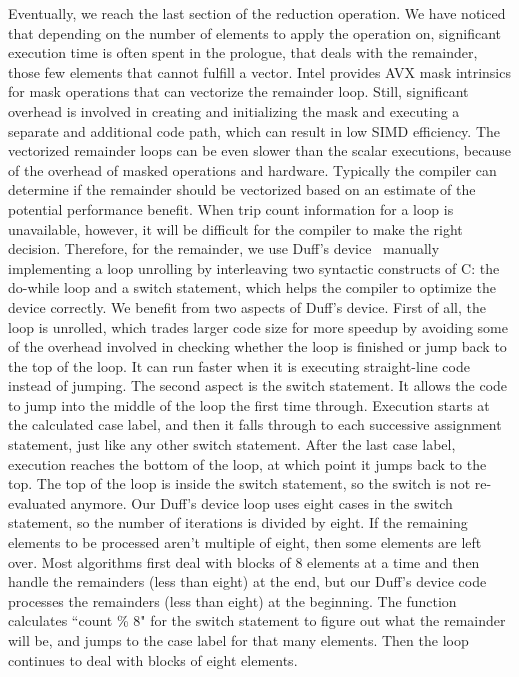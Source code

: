 \documentclass[5p,times,twocolumn]{elsarticle}
\begin{document}
Eventually, we reach the last section of the reduction operation. We have
noticed that depending on the number of elements to apply the
operation on, significant execution time is often spent in the
prologue, that deals with the remainder, those few elements that cannot fulfill a vector.
Intel provides AVX mask intrinsics for mask operations that can vectorize the remainder loop.
Still, significant overhead is involved in creating and initializing the mask and
executing a separate and additional code path, which can result in low SIMD efficiency.
%
The vectorized remainder loops can be even slower than the scalar executions,
because of the overhead of masked operations and hardware.
%
Typically the compiler can determine if the remainder should be vectorized
based on an estimate of the potential performance benefit. When trip count information for a
loop is unavailable, however, it will be difficult for the
compiler to make the right decision.
%
Therefore, for the remainder, we use Duff's
device~\cite{wiki:duff} manually implementing a loop unrolling by
interleaving two syntactic constructs of C: the do-while loop and a
switch statement, which helps the compiler to optimize the device
correctly.
%
We benefit from two aspects of Duff's device. First of all, the loop is unrolled,
which trades larger code size for more speedup by avoiding some of the overhead
involved in checking whether the loop is finished or jump back to the
top of the loop.
It can run faster when it is executing straight-line code instead of jumping.
The second aspect is the switch statement. It allows the code to jump into the middle of the
loop the first time through.
Execution starts at the calculated case label, and then it falls through to each successive
assignment statement, just like any other switch statement.
%
After the last case label, execution reaches the bottom of the loop, at which point it jumps back to the top. The top of the loop is inside the switch statement, so the switch is not re-evaluated anymore.
%
Our Duff's device loop uses eight cases in the switch statement, so the number of iterations is divided by eight.
If the remaining elements to be processed aren't multiple of eight, then some elements are left over.
Most algorithms first deal with blocks of 8 elements at a time and then handle the remainders (less than eight) at the end,
but our Duff's device code processes the remainders (less than eight) at the beginning.
The function calculates ``count \% 8" for the switch statement to figure out what the remainder will be, and jumps to the case label for that many elements.
Then the loop continues to deal with blocks of eight elements.
\end{document}
